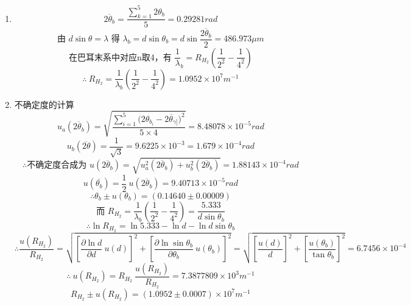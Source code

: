 \documentclass[11pt,a4paper,oneside]{article}
\begin{document}
\begin{enumerate}
  \item { }
      $$\overline{2{\theta}_b} = \displaystyle\frac{\sum_{k=1}^5 2{\theta}_b}{5} = 0.29281rad$$
      $$\displaystyle\text{由\ }d\sin{\theta} = {\lambda}\text{\ 得\ }{\lambda}_b = d\sin{\theta}_b = d\sin{\frac{\overline{2{\theta}_b}}{2}} = 486.973\mu m $$
      $$\displaystyle\text{在巴耳末系中对应n取4，有\ }\frac{1}{\lambda}_b = R_{H_2}\left(\frac{1}{2^2}-\frac{1}{4^2}\right)$$
      $$\therefore\ \displaystyle R_{H_2} = \frac{1}{ {\lambda}_b}\left(\frac{1}{2^2}-\frac{1}{4^2}\right) = 1.0952{\times}10^{7}m^{-1}$$
  \item {不确定度的计算}
      $$u_a(\overline{2{\theta}_b}) = \displaystyle\sqrt{\frac{\sum_{i=1}^5{(2{\theta}_{b_{i}}-\overline{2{\theta}_{\gamma]}}})^2}{5\times4}}=8.48078{\times}10^{-5}rad$$
      $$u_b(\overline{2\theta}) = \displaystyle\frac{1}{\sqrt3} = 9.6225\times10^{-3} = 1.679 \times 10^{-4} rad$$
      $$\therefore\text{不确定度合成为\ }u(\overline{2{\theta}_b}) = \sqrt{u_a^2(\overline{2{\theta}_b})+u_b^2(\overline{2{\theta}_b})} = 1.88143{\times}10^{-4}rad$$
      $$u(\overline{ {\theta}_b})= \displaystyle\frac12\ u(\overline{2{\theta}_b}) = 9.40713{\times}10^{-5}rad$$
      $$\therefore{\theta}_b \pm u({\theta}_b) = (0.14640\pm0.00009)$$
      $$\text{而\ }\displaystyle R_{H_2} = \frac{1}{ {\lambda}_b}\left(\frac{1}{2^2}-\frac{1}{4^2}\right) = \frac{5.333}{d\sin{\theta}_b}$$
      $$\therefore\ln{R_{H_2}} = \ln{5.333} -\ln{d} - \ln{d\sin{\theta}_b}$$
      $$\therefore\displaystyle \frac{u(R_{H_2})}{R_{H_2}} = \sqrt{ {\left[\frac{\partial{\ln{d}}}{\partial{d}}\ u(d)\right]}^2 + {\left[\frac{\partial{\ln{\sin{ {\theta}_b}}}}{\partial{ {\theta}_b}}\ u({\theta}_b)\right]}^2} = \sqrt{ {\left[\frac{u(d)}{d}\right]}^2 + {\left[\frac{u({\theta}_b)}{\tan{ {\theta}_b}}\right]}^2} = 6.7456{\times}10^{-4}$$
      $$\therefore \ u(R_{H_2}) = \displaystyle R_{H_2}\ \frac{u(R_{H_2})}{R_{H_2}} = 7.3877809{\times}10^{3}m^{-1}$$ 
      $$R_{H_2} \pm u(R_{H_2}) = (1.0952\pm0.0007){\times}10^{7}m^{-1}$$
\end{enumerate}
\end{document}
